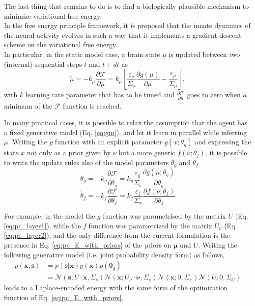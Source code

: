 \documentclass[10pt]{article}
\begin{document}
The last thing that remains to do is to find a biologically plausible mechanism to minimize variational free energy.\\
In the free energy principle framework, it is proposed that the innate dynamics of the neural activity evolves in such a way that it implements a gradient descent scheme on the variational free energy. \\
In particular, in the static model case, a brain state $\mu$ is updated between two (internal) sequential steps $t$ and $t+dt$ as
\begin{equation}
    \dot{\mu} = - k_{\mu} \frac{\partial \mathcal{F}}{\partial \mu} = k_{\mu}\left[ \frac{\varepsilon_s}{\Sigma_s}\frac{\partial g(\mu)}{\partial \mu} - \frac{\varepsilon_{\mu}}{\Sigma_{\mu}} \right],
\end{equation}
with $k$ learning rate parameter that has to be tuned and $\frac{\partial \mathcal{F}}{\partial \mu}$ goes to zero when a minimum of the $\mathcal{F}$ function is reached.

In many practical cases, it is possible to relax the assumption that the agent has a fixed generative model (Eq. \ref{eq:gm}), and let it learn in parallel while inferring $\mu$. Writing the $g$ function with an explicit parameter $g(x;\theta_g)$ and expressing the state $x$ not only as a prior given by $\nu$ but a more generic $f(\nu; \theta_{f})$, it is possible to write the update rules also of the model parameters $\theta_g$ and $\theta_f$
\begin{equation}
    \dot{\theta}_g = - k_{g} \frac{\partial \mathcal{F}}{\partial \theta_{g}} = k_{g} \frac{\varepsilon_g}{\Sigma_{s}}\frac{\partial g(\mu;\theta_g)}{\partial \theta_g}
    \label{eq:g_parameter}
\end{equation}
\begin{equation}
    \dot{\theta}_f = - k_{f} \frac{\partial \mathcal{F}}{\partial \theta_{f}} = k_{f} \frac{\varepsilon_f}{\Sigma_{x}}\frac{\partial f(\nu;\theta_f)}{\partial \theta_f}
    \label{eq:f_parameter}
\end{equation}

For example, in the \citep{Rao1999} model the $g$ function was parametrised by the matrix $U$ (Eq. \ref{eq:pc_layer1}), while the $f$ function was parametrized by the matrix $U_\nu$ (Eq. \ref{eq:pc_layer2}), and the only difference from the current formulation is the presence in Eq. \ref{eq:pc_E_with_priors} of the priors on $\bm \mu$ and $U$. Writing the following generative model (i.e. joint probability density form) as follows, 
\begin{equation}
\begin{split}
	p(\bm x, \bm s) &= p(\bm s | \bm x) p(\bm x) p(\bm \theta_g)\\ 
	&= \mathcal{N}(\bm s; U \cdot \bm x, \Sigma_s) \mathcal{N}(\bm x; U_\nu \cdot \bm \nu, \Sigma_\nu) \mathcal{N}(\bm x; 0, \Sigma_x) \mathcal{N}(U; 0, \Sigma_U)
\end{split}
\end{equation}
leads to a Laplace-encoded energy with the same form of the optimization function of Eq. \ref{eq:pc_E_with_priors}.
\end{document}
